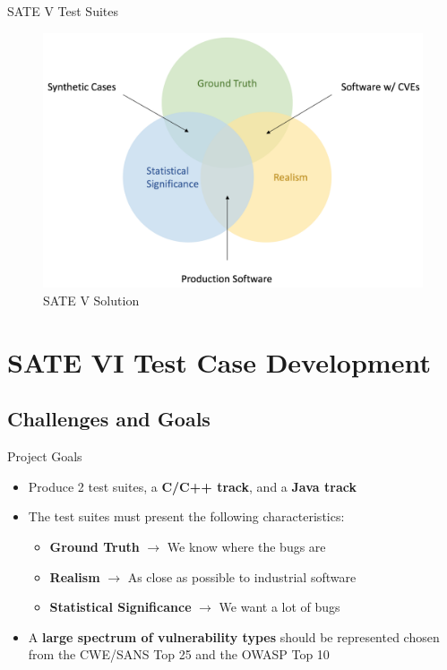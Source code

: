 \documentclass[aspectratio=169]{beamer}
\begin{document}
  \begin{frame}{SATE V Test Suites}
    \begin{figure}
      \centering
      \includegraphics[scale=0.33]{figures/sate-v-test-suites}
      \caption{SATE V Solution}
    \end{figure}
  \end{frame}
  
  \section{SATE VI Test Case Development}

  \subsection{Challenges and Goals}

  \begin{frame}{Project Goals}
    \begin{itemize}
    \setlength\itemsep{1em}
    \item Produce 2 test suites, a \textbf{C/C++ track}, and a \textbf{Java track}
    \pause
    \item The test suites must present the following characteristics:
      \vspace{0.3em}
      \begin{itemize}
      \setlength\itemsep{0.5em}
      \item \textbf{Ground Truth} $\rightarrow$ We know where the bugs are
      \item \textbf{Realism} $\rightarrow$ As close as possible to industrial software
      \item \textbf{Statistical Significance} $\rightarrow$ We want a lot of bugs
      \end{itemize}
    \pause
    \item A \textbf{large spectrum of vulnerability types} should be represented chosen from the CWE/SANS Top 25 and the OWASP Top 10
    \end{itemize}
  \end{frame}
\end{document}
